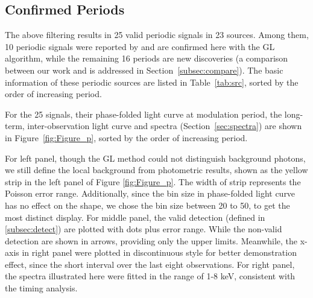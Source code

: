 \documentclass[twoside,twocolumn]{aastex63}
\begin{document}


\subsection{Confirmed Periods}
The above filtering results in 25 valid periodic signals in 23 sources.
Among them, 10 periodic signals were reported by \citet{2012ApJ...746..165H} and are confirmed here with the GL algorithm, while the remaining 16 periods are new discoveries (a comparison between our work and \citealp{2012ApJ...746..165H} is addressed in Section~\ref{subsec:compare}). 
The basic information of these periodic sources are listed in Table~\ref{tab:src}, sorted by the order of increasing period. 


For the 25 signals, their phase-folded light curve at modulation period, the long-term, inter-observation light curve and spectra (Section~\ref{sec:spectra}) are shown in Figure~\ref{fig:Figure_p}, sorted by the order of increasing period. 

For left panel, though the GL method could not distinguish background photons, we still define the local background from photometric results, shown as the yellow strip in the left panel of Figure \ref{fig:Figure_p}. The width of strip represents the Poisson error range.
Additionally, since the bin size in phase-folded light curve has no effect on the shape, we chose the bin size between 20 to 50, to get the most distinct display. 
For middle panel, the valid detection (defined in \ref{subsec:detect}) are plotted with dots plus error range. While the non-valid detection are shown in arrows, providing only the upper limits. Meanwhile, the x-axis in right panel were plotted in discontinuous style for better demonstration effect, since the short interval over the last eight observations. 
For right panel, the spectra illustrated here were fitted in the range of 1-8 keV, consistent with the timing analysis. 
\end{document}

